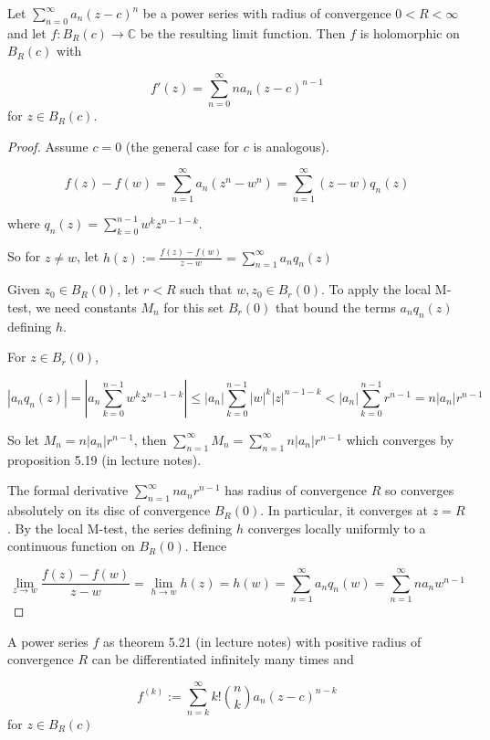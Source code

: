 \begin{theorem}
	Let $\sum_{n = 0}^{\infty} a_n {(z - c)}^n$ be a power series with radius of convergence $0 < R < \infty$ and let $f: B_R(c) \rightarrow \mathbb{C}$ be the resulting limit function. Then $f$ is holomorphic on $B_R(c)$ with

	\[f'(z) = \sum_{n = 0}^{\infty} n a_n {(z - c)}^{n - 1}\] for $z \in B_R(c)$.
\end{theorem}

\begin{proof}
	Assume $c = 0$ (the general case for $c$ is analogous).

	\[f(z) - f(w) = \sum_{n = 1}^{\infty} a_n (z^n - w^n) = \sum_{n = 1}^{\infty} (z - w) q_n(z)\]
	
	where $q_n(z) = \sum_{k = 0}^{n - 1} w^k z^{n - 1 - k}$.

	So for $z \ne w$, let $h(z) := \frac{f(z) - f(w)}{z - w} = \sum_{n = 1}^{\infty} a_n q_n(z)$

	Given $z_0 \in B_R(0)$, let $r < R$ such that $w, z_0 \in B_r(0)$. To apply the local M-test, we need constants $M_n$ for this set $B_r(0)$ that bound the terms $a_n q_n(z)$ defining $h$.

	For $z \in B_r(0)$,

	\[|a_n q_n(z)| = |a_n \sum_{k = 0}^{n - 1} w^k z^{n - 1 - k}| \le |a_n| \sum_{k = 0}^{n - 1} |w|^k |z|^{n - 1 - k} < |a_n| \sum_{k = 0}^{n - 1} r^{n - 1} = n |a_n| r^{n - 1}\]

	So let $M_n = n|a_n| r^{n - 1}$, then $\sum_{n = 1}^{\infty} M_n = \sum_{n = 1}^{\infty} n|a_n| r^{n - 1}$ which converges by proposition 5.19 (in lecture notes).

	The formal derivative $\sum_{n = 1}^{\infty} n a_n r^{n - 1}$ has radius of convergence $R$ so converges absolutely on its disc of convergence $B_R(0)$. In particular, it converges at $z = R$. By the local M-test, the series defining $h$ converges locally uniformly to a continuous function on $B_R(0)$. Hence
	
	\[\lim_{z \rightarrow w} \frac{f(z) - f(w)}{z - w} = \lim_{h \rightarrow w} h(z) = h(w) = \sum_{n = 1}^{\infty} a_n q_n(w) = \sum_{n = 1}^{\infty} n a_n w^{n - 1}\]
\end{proof}

\begin{corollary}
	A power series $f$ as theorem 5.21 (in lecture notes) with positive radius of convergence $R$ can be differentiated infinitely many times and
	
	\[f^{(k)} := \sum_{n = k}^{\infty} k! {n \choose k} a_n {(z - c)}^{n - k}\] for $z \in B_R(c)$
\end{corollary}

